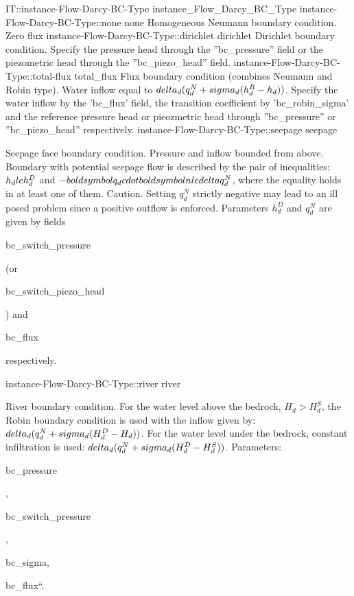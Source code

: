 \begin{SelectionType}
	{IT::instance-Flow-Darcy-BC-Type}
	{instance{\_}Flow{\_}Darcy{\_}BC{\_}Type}
	{}
		\SelectionItem
			{instance-Flow-Darcy-BC-Type::none}
			{none}
			{{{Homogeneous Neumann boundary condition.
Zero flux}%
}}
		\SelectionItem
			{instance-Flow-Darcy-BC-Type::dirichlet}
			{dirichlet}
			{{{Dirichlet boundary condition.
Specify the pressure head through the ''bc{\_}pressure'' field or the piezometric head through the ''bc{\_}piezo{\_}head'' field.}%
}}
		\SelectionItem
			{instance-Flow-Darcy-BC-Type::total-flux}
			{total{\_}flux}
			{{{Flux boundary condition (combines Neumann and Robin type). Water inflow equal to }{$ \\delta_d(q_d^N + \\sigma_d (h_d^R - h_d) )$}{. Specify the water inflow by the 'bc{\_}flux' field, the transition coefficient by 'bc{\_}robin{\_}sigma' and the reference pressure head or pieozmetric head through ''bc{\_}pressure'' or ''bc{\_}piezo{\_}head'' respectively.}%
}}
		\SelectionItem
			{instance-Flow-Darcy-BC-Type::seepage}
			{seepage}
			{{{Seepage face boundary condition.
Pressure and inflow bounded from above.
Boundary with potential seepage flow is described by the pair of inequalities: }{$h_d \\le h_d^D$}{ and }{$ -\\boldsymbol q_d\\cdot\\boldsymbol n \\le \\delta q_d^N$}{, where the equality holds in at least one of them.
Caution.
Setting }{$q_d^N$}{ strictly negative may lead to an ill posed problem since a positive outflow is enforced.
Parameters }{$h_d^D$}{ and }{$q_d^N$}{ are given by fields }\begin{ttfamily}bc{\_}switch{\_}pressure\end{ttfamily}{ (or }\begin{ttfamily}bc{\_}switch{\_}piezo{\_}head\end{ttfamily}{) and }\begin{ttfamily}bc{\_}flux\end{ttfamily}{ respectively.}%
}}
		\SelectionItem
			{instance-Flow-Darcy-BC-Type::river}
			{river}
			{{{River boundary condition.
For the water level above the bedrock, }{$H_d > H_d^S$}{, the Robin boundary condition is used with the inflow given by: }{ $ \\delta_d(q_d^N + \\sigma_d(H_d^D - H_d) )$}{. For the water level under the bedrock, constant infiltration is used: }{ $ \\delta_d(q_d^N + \\sigma_d(H_d^D - H_d^S) )$}{. Parameters: }\begin{ttfamily}bc{\_}pressure\end{ttfamily}{, }\begin{ttfamily}bc{\_}switch{\_}pressure\end{ttfamily}{,  }\begin{ttfamily}bc{\_}sigma,\end{ttfamily}{bc{\_}flux``.}%
}}
\end{SelectionType}
